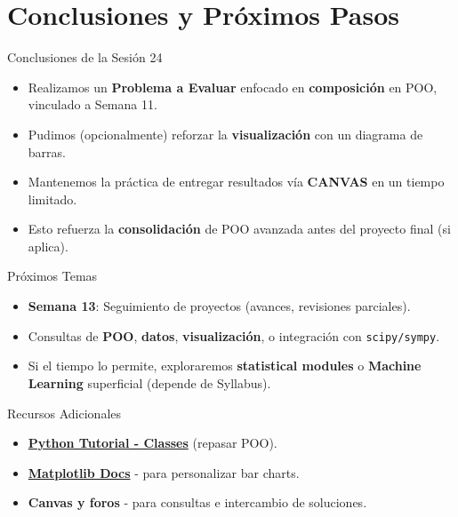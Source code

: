 \documentclass[10pt]{beamer}
\begin{document}
\section{Conclusiones y Próximos Pasos}

\begin{frame}{Conclusiones de la Sesión 24}
  \begin{itemize}
    \item Realizamos un \textbf{Problema a Evaluar} enfocado en \textbf{composición} en POO, vinculado a Semana 11.
    \item Pudimos (opcionalmente) reforzar la \textbf{visualización} con un diagrama de barras.
    \item Mantenemos la práctica de entregar resultados vía \textbf{CANVAS} en un tiempo limitado.
    \item Esto refuerza la \textbf{consolidación} de POO avanzada antes del proyecto final (si aplica).
  \end{itemize}
\end{frame}

\begin{frame}{Próximos Temas}
  \begin{itemize}
    \item \textbf{Semana 13}: Seguimiento de proyectos (avances, revisiones parciales).
    \item Consultas de \textbf{POO}, \textbf{datos}, \textbf{visualización}, o integración con \texttt{scipy/sympy}.
    \item Si el tiempo lo permite, exploraremos \textbf{statistical modules} o \textbf{Machine Learning} superficial (depende de Syllabus).
  \end{itemize}
\end{frame}

\begin{frame}{Recursos Adicionales}
  \begin{itemize}
    \item \href{https://docs.python.org/3/tutorial/classes.html}{\textbf{Python Tutorial - Classes}} (repasar POO).
    \item \href{https://matplotlib.org/stable/}{\textbf{Matplotlib Docs}} - para personalizar bar charts.
    \item \textbf{Canvas y foros} - para consultas e intercambio de soluciones.
  \end{itemize}
\end{frame}
\end{document}
